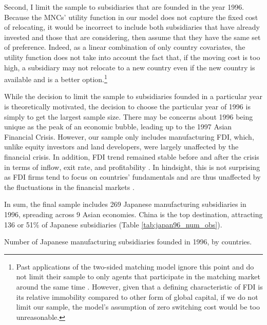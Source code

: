 Second, I limit the sample to subsidiaries that are founded in the year 1996. Because the MNCs'
utility function in our model does not capture the fixed cost of relocating, it
would be incorrect to include both subsidiaries that have already invested and
those that are considering, then assume that they have the same set of preference.
Indeed, as a linear combination of only country covariates, the utility function
does not take into account the fact that, if the moving cost is too high, a
subsidiary may not relocate to a new country even if the new country is
available and is a better option.\footnote{Past
applications of the two-sided matching model ignore this point and do not limit
their sample to only agents that participate in the matching market around
the same time \citep{Logan1996, Logan2008}. However, given that a defining
characteristic of FDI is its relative immobility compared to other form of
global capital, if we do not limit our sample, the model's assumption of zero switching cost would be too
unreasonable.}

While the decision to limit the sample to subsidiaries founded in a particular
year is theoretically motivated, the decision to choose the particular year of
1996 is simply to get the largest sample size. There may be concerns about 1996
being unique as the peak of an economic bubble, leading up to the 1997 Asian Financial Crisis.
However, our sample only includes manufacturing FDI, which, unlike equity
investors and land developers, were largely unaffected by the financial crisis.
In addition, FDI trend remained stable before and after the crisis in terms of
inflow, exit rate, and profitability \citep{Delios2001, UNCTAD1998}. In
hindsight, this is not surprising as FDI firms tend to focus on countries' fundamentals
and are thus unaffected by the fluctuations in the financial markets
\citep{Ahlquist2006}.

In sum, the final sample includes 269 Japanese manufacturing subsidiaries in 1996, spreading
across 9 Asian economies. China is the top destination, attracting 136 or 51\%
of Japanese subsidiaries (Table \ref{tab:japan96_num_obs}).

\begin{table}[tbp]
  \centering
  \caption[Number of Japanese manufacturing subsidiaries founded in 1996, by
  countries.]{Number of Japanese manufacturing subsidiaries founded in 1996, by countries.}
  \label{tab:japan96_num_obs}
  
\end{table}

